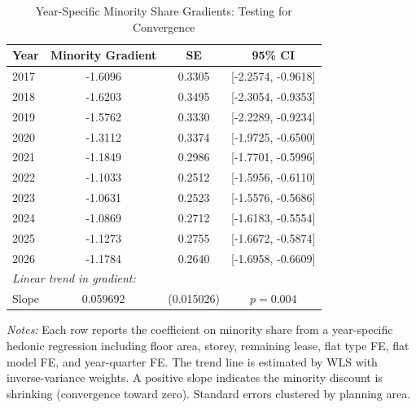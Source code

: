 \begin{table}[t]
\centering
\caption{Year-Specific Minority Share Gradients: Testing for Convergence}
\label{tab:convergence}
\begin{tabular}{lccc}
\hline\hline
Year & Minority Gradient & SE & 95\% CI \\
\hline
2017 & -1.6096 & 0.3305 & [-2.2574, -0.9618] \\
2018 & -1.6203 & 0.3495 & [-2.3054, -0.9353] \\
2019 & -1.5762 & 0.3330 & [-2.2289, -0.9234] \\
2020 & -1.3112 & 0.3374 & [-1.9725, -0.6500] \\
2021 & -1.1849 & 0.2986 & [-1.7701, -0.5996] \\
2022 & -1.1033 & 0.2512 & [-1.5956, -0.6110] \\
2023 & -1.0631 & 0.2523 & [-1.5576, -0.5686] \\
2024 & -1.0869 & 0.2712 & [-1.6183, -0.5554] \\
2025 & -1.1273 & 0.2755 & [-1.6672, -0.5874] \\
2026 & -1.1784 & 0.2640 & [-1.6958, -0.6609] \\
\hline
\multicolumn{4}{l}{\textit{Linear trend in gradient:}} \\
Slope & 0.059692 & (0.015026) & $p = 0.004$ \\
\hline\hline
\end{tabular}
\begin{tablenotes}[flushleft]\small
\item \textit{Notes:} Each row reports the coefficient on minority share from a year-specific hedonic regression including floor area, storey, remaining lease, flat type FE, flat model FE, and year-quarter FE. The trend line is estimated by WLS with inverse-variance weights. A positive slope indicates the minority discount is shrinking (convergence toward zero). Standard errors clustered by planning area.
\end{tablenotes}
\end{table}

